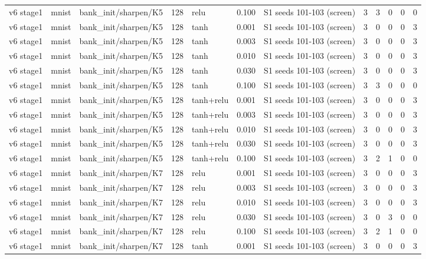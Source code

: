 \begin{table}[htbp]
{\begin{tabular}{@{}lllrlrlrrrrr@{}}
v6 stage1 & mnist & bank\_init/sharpen/K5 & 128 & relu & 0.100 & S1 seeds 101-103 (screen) & 3 & 3 & 0 & 0 & 0 \\
v6 stage1 & mnist & bank\_init/sharpen/K5 & 128 & tanh & 0.001 & S1 seeds 101-103 (screen) & 3 & 0 & 0 & 0 & 3 \\
v6 stage1 & mnist & bank\_init/sharpen/K5 & 128 & tanh & 0.003 & S1 seeds 101-103 (screen) & 3 & 0 & 0 & 0 & 3 \\
v6 stage1 & mnist & bank\_init/sharpen/K5 & 128 & tanh & 0.010 & S1 seeds 101-103 (screen) & 3 & 0 & 0 & 0 & 3 \\
v6 stage1 & mnist & bank\_init/sharpen/K5 & 128 & tanh & 0.030 & S1 seeds 101-103 (screen) & 3 & 0 & 0 & 0 & 3 \\
v6 stage1 & mnist & bank\_init/sharpen/K5 & 128 & tanh & 0.100 & S1 seeds 101-103 (screen) & 3 & 3 & 0 & 0 & 0 \\
v6 stage1 & mnist & bank\_init/sharpen/K5 & 128 & tanh+relu & 0.001 & S1 seeds 101-103 (screen) & 3 & 0 & 0 & 0 & 3 \\
v6 stage1 & mnist & bank\_init/sharpen/K5 & 128 & tanh+relu & 0.003 & S1 seeds 101-103 (screen) & 3 & 0 & 0 & 0 & 3 \\
v6 stage1 & mnist & bank\_init/sharpen/K5 & 128 & tanh+relu & 0.010 & S1 seeds 101-103 (screen) & 3 & 0 & 0 & 0 & 3 \\
v6 stage1 & mnist & bank\_init/sharpen/K5 & 128 & tanh+relu & 0.030 & S1 seeds 101-103 (screen) & 3 & 0 & 0 & 0 & 3 \\
v6 stage1 & mnist & bank\_init/sharpen/K5 & 128 & tanh+relu & 0.100 & S1 seeds 101-103 (screen) & 3 & 2 & 1 & 0 & 0 \\
v6 stage1 & mnist & bank\_init/sharpen/K7 & 128 & relu & 0.001 & S1 seeds 101-103 (screen) & 3 & 0 & 0 & 0 & 3 \\
v6 stage1 & mnist & bank\_init/sharpen/K7 & 128 & relu & 0.003 & S1 seeds 101-103 (screen) & 3 & 0 & 0 & 0 & 3 \\
v6 stage1 & mnist & bank\_init/sharpen/K7 & 128 & relu & 0.010 & S1 seeds 101-103 (screen) & 3 & 0 & 0 & 0 & 3 \\
v6 stage1 & mnist & bank\_init/sharpen/K7 & 128 & relu & 0.030 & S1 seeds 101-103 (screen) & 3 & 0 & 3 & 0 & 0 \\
v6 stage1 & mnist & bank\_init/sharpen/K7 & 128 & relu & 0.100 & S1 seeds 101-103 (screen) & 3 & 2 & 1 & 0 & 0 \\
v6 stage1 & mnist & bank\_init/sharpen/K7 & 128 & tanh & 0.001 & S1 seeds 101-103 (screen) & 3 & 0 & 0 & 0 & 3 \\

\end{tabular}}
\end{table}
